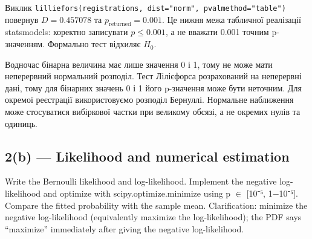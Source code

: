 \documentclass[11pt]{article}
\begin{document}
Виклик
\texttt{lilliefors(registrations,\ dist="norm",\ pvalmethod="table")}
повернув \(D=0.457078\) та \(p_{\mathrm{returned}}=0.001\). Це нижня
межа табличної реалізації statsmodels: коректно записувати
\(p\le0.001\), а не вважати 0.001 точним p-значенням. Формально тест
відхиляє \(H_0\).

Водночас бінарна величина має лише значення 0 і 1, тому не може мати
неперервний нормальний розподіл. Тест Лілієфорса розрахований на
неперервні дані, тому для бінарних значень 0 і 1 його p-значення може
бути неточним. Для окремої реєстрації використовуємо розподіл Бернуллі.
Нормальне наближення може стосуватися вибіркової частки при великому
обсязі, а не окремих нулів та одиниць.

    \subsection{2(b) --- Likelihood and numerical
estimation}\label{b-likelihood-and-numerical-estimation}

Write the Bernoulli likelihood and log-likelihood. Implement the
negative log-likelihood and optimize with scipy.optimize.minimize using
p \ensuremath{\in} {[}10⁻⁵, 1−10⁻⁵{]}. Compare the fitted probability with the sample
mean. Clarification: minimize the negative log-likelihood (equivalently
maximize the log-likelihood); the PDF says ``maximize'' immediately
after giving the negative log-likelihood.
\end{document}
